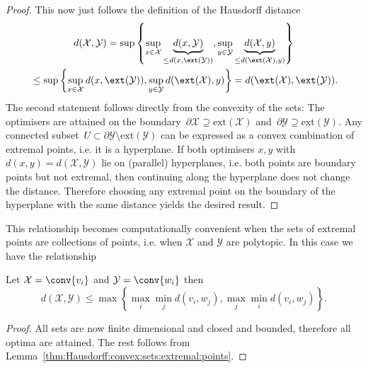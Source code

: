 \begin{proof}
This now just follows the definition of the Hausdorff distance
%
\begin{multline}
	d(\mathcal X,\mathcal Y) = \sup\left\{\sup_{x\in\mathcal X} \underbrace{d(x,\mathcal Y)}_{\leq d(x,\ext(\mathcal Y))}, \sup_{y\in\mathcal Y} \underbrace{d(\mathcal X,y)}_{\leq d(\ext(\mathcal X),y)} \right\}\\ \leq 
	\sup\left\{\sup_{x\in\mathcal X} d(x,\ext(\mathcal Y)), \sup_{y\in\mathcal Y}  d(\ext(\mathcal X),y) \right\} = d(\ext(\mathcal X),\ext(\mathcal Y)).
\end{multline}
%
The second statement follows directly from the convexity of the sets: The optimisers are attained on the boundary~$\partial \mathcal X\supseteq\text{ext}(\mathcal X)$ and~$\partial\mathcal Y\supseteq\text{ext}(\mathcal Y)$.
%
Any connected subset~$U \subset \partial\mathcal Y\setminus\text{ext}(\mathcal Y)$ can be expressed as a convex combination of extremal points, i.e. it is a hyperplane. 
%
If both optimisers $x,y$ with $d(x,y) = d(\mathcal X,\mathcal Y)$ lie on (parallel) hyperplanes, i.e. both points are boundary points but not extremal, then continuing along the hyperplane does not change the distance.
%
Therefore choosing any extremal point on the boundary of the hyperplane with the same distance yields the desired result.
%
\end{proof}
%
This relationship becomes computationally convenient when the sets of extremal points are collections of points, i.e. when $\mathcal X$ and $\mathcal Y$ are polytopic. 
%
In this case we have the relationship
%
\begin{thm}
Let $\mathcal X = \conv\{v_i\}$ and $\mathcal Y = \conv\{w_i\}$ then
%
\begin{equation}\label{eq:maximal:distance:between:vertices}
	d(\mathcal X,\mathcal Y) \leq \max\left\{\max_i\min_j d(v_i,w_j),\max_j\min_i d(v_i,w_j)\right\}.
\end{equation}
\end{thm}
%
\begin{proof}
All sets are now finite dimensional and closed and bounded, therefore all optima are attained.
%
The rest follows from Lemma~\ref{thm:Hausdorff:convex:sets:extremal:points}.
\end{proof}